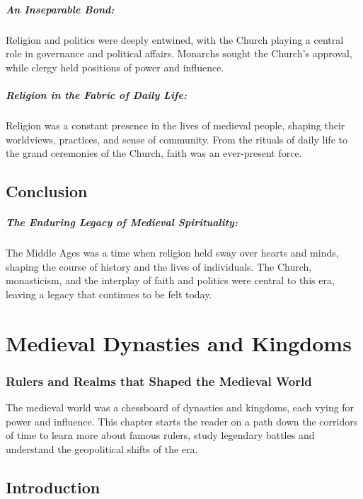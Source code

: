 \documentclass{book}
\begin{document}
\paragraph{An Inseparable Bond:}
Religion and politics were deeply entwined, with the Church playing a central role in governance and political affairs. Monarchs sought the Church’s approval, while clergy held positions of power and influence.

\paragraph{Religion in the Fabric of Daily Life:}
Religion was a constant presence in the lives of medieval people, shaping their worldviews, practices, and sense of community. From the rituals of daily life to the grand ceremonies of the Church, faith was an ever-present force.

\section*{Conclusion}

\paragraph{The Enduring Legacy of Medieval Spirituality:}
The Middle Ages was a time when religion held sway over hearts and minds, shaping the course of history and the lives of individuals. The Church, monasticism, and the interplay of faith and politics were central to this era, leaving a legacy that continues to be felt today.

\chapter{Medieval Dynasties and Kingdoms}
\subsection*{Rulers and Realms that Shaped the Medieval World}
The medieval world was a chessboard of dynasties and kingdoms, each vying for power and influence. This chapter starts the reader on a path down the corridors of time to learn more about famous rulers, study legendary battles and understand the geopolitical shifts of the era.

\section*{Introduction}
\end{document}
